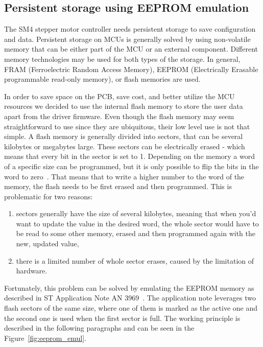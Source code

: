 
\subsection{Persistent storage using EEPROM emulation}
\label{subsec:eeprom}
The SM4 stepper motor controller needs persistent storage to save configuration and data.
Persistent storage on MCUs is generally solved by using non-volatile memory that can be either part of the MCU or an external component.
Different memory technologies may be used for both types of the storage.
In general, FRAM (Ferroelectric Random Access Memory), EEPROM (Electrically Erasable programmable read-only memory), or flash memories are used.

In order to save space on the PCB, save cost, and better utilize the MCU resources we decided to use the internal flash memory to store the user data apart from the driver firmware.
Even though the flash memory may seem straightforward to use since they are ubiquitous, their low level use is not that simple.
A flash memory is generally divided into sectors, that can be several kilobytes or megabytes large.
These sectors can be electrically erased - which means that every bit in the sector is set to 1.
Depending on the memory a word of a specific size can be programmed, but it is only possible to flip the bits in the word to zero~\cite{pablo_mansanet_ecorax_nodate}.
That means that to write a higher number to the word of the memory, the flash needs to be first erased and then programmed.
This is problematic for two reasons:
\begin{enumerate}
    \item sectors generally have the size of several kilobytes, meaning that when you'd want to update the value in the desired word, the whole sector would have to be read to some other memory, erased and then programmed again with the new, updated value,
    \item there is a limited number of whole sector erases, caused by the limitation of hardware.
\end{enumerate}

Fortunately, this problem can be solved by emulating the EEPROM memory as described in ST Application Note AN 3969~\cite{stmicro_an3969_2011}.
The application note leverages two flash sectors of the same size, where one of them is marked as the active one and the second one is used when the first sector is full.
The working principle is described in the following paragraphs and can be seen in the Figure~\ref{fig:eeprom_emul}.


